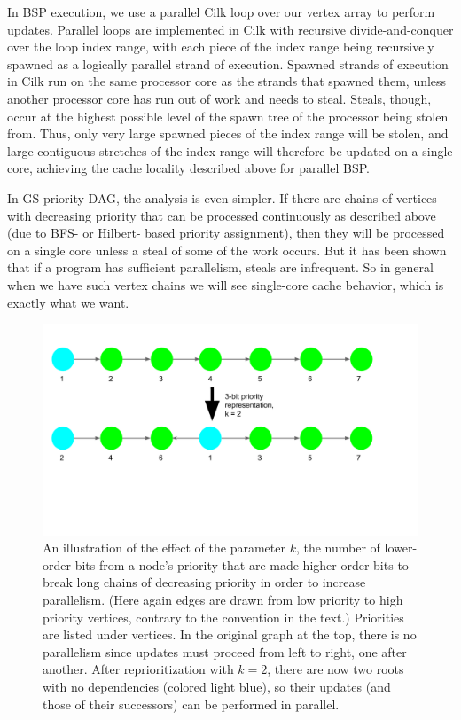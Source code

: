 \documentclass[journal]{IEEEtran}
\begin{document}
In BSP execution, we use a parallel Cilk loop over our vertex array to perform updates. Parallel loops are implemented in Cilk with recursive divide-and-conquer over the loop index range, with each piece of the index range being recursively spawned as a logically parallel strand of execution. Spawned strands of execution in Cilk run on the same processor core as the strands that spawned them, unless another processor core has run out of work and needs to steal. Steals, though, occur at the highest possible level of the spawn tree of the processor being stolen from. Thus, only very large spawned pieces of the index range will be stolen, and large contiguous stretches of the index range will therefore be updated on a single core, achieving the cache locality described above for parallel BSP.

In GS-priority DAG, the analysis is even simpler. If there are chains of vertices with decreasing priority that can be processed continuously as described above (due to BFS- or Hilbert- based priority assignment), then they will be processed on a single core unless a steal of some of the work occurs. But it has been shown \cite{cilk} that if a program has sufficient parallelism, steals are infrequent. So in general when we have such vertex chains we will see single-core cache behavior, which is exactly what we want.

\begin{figure}[ht]
\centering
\includegraphics[trim=0cm 5cm 3cm 2cm, width=\textwidth,keepaspectratio]{k_effect}
\caption{An illustration of the effect of the parameter $k$, the number of lower-order bits from a node's priority that are made higher-order bits to break long chains of decreasing priority in order to increase parallelism. (Here again edges are drawn from low priority to high priority vertices, contrary to the convention in the text.) Priorities are listed under vertices. In the original graph at the top, there is no parallelism since updates must proceed from left to right, one after another. After reprioritization with $k = 2$, there are now two roots with no dependencies (colored light blue), so their updates (and those of their successors) can be performed in parallel.}
\label{fig_k}
\end{figure}
\end{document}
